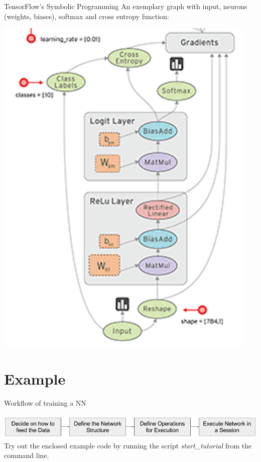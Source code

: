 \documentclass[18pt]{beamer}
\begin{document}
\begin{frame}{TensorFlow's Symbolic Programming}
An exemplary graph with input, neurons (weights, biases), softmax and cross entropy function:
\begin{center}
\includegraphics[scale=0.55]{figures/graph.png}
\end{center}
\end{frame}

\section{Example}
\begin{frame}{Workflow of training a NN}
\begin{center}
\includegraphics[scale=0.4]{figures/tensorflow_workflow.png}\\Try out the enclosed example code by running the script \emph{start\_tutorial} from the command line. 
\end{center}
\end{frame}
\end{document}
